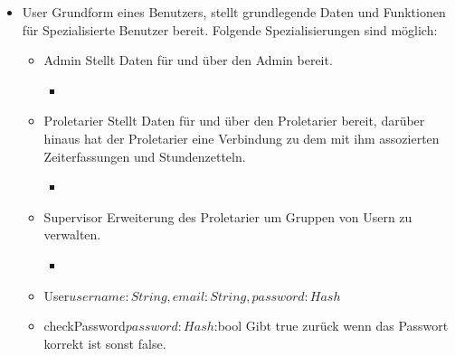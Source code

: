         \begin{itemize}

            \item{User}
                Grundform eines Benutzers, stellt grundlegende Daten und Funktionen für Spezialisierte Benutzer bereit.
                Folgende Spezialisierungen sind möglich:
                \begin{itemize}
                    \item{Admin}
                        Stellt Daten für und über den Admin bereit.
                    \begin{itemize}
                        \item{}
                    \end{itemize}

                    \item{Proletarier}
                        Stellt Daten für und über den Proletarier bereit, darüber hinaus hat der Proletarier eine Verbindung zu dem mit ihm assozierten Zeiterfassungen und Stundenzetteln.
                        \begin{itemize}
                            \item{}
                        \end{itemize}

                    \item{Supervisor}
                        Erweiterung des Proletarier um Gruppen von Usern zu verwalten.
                        \begin{itemize}
                            \item{}
                        \end{itemize}

                \end{itemize}
                \begin{itemize}
                    \item{User\(username:String , email:String, password:Hash\)}
                    \item{checkPassword\(password:Hash\):bool}
                        Gibt true zurück wenn das Passwort korrekt ist sonst false.
                \end{itemize}


\end{itemize}
